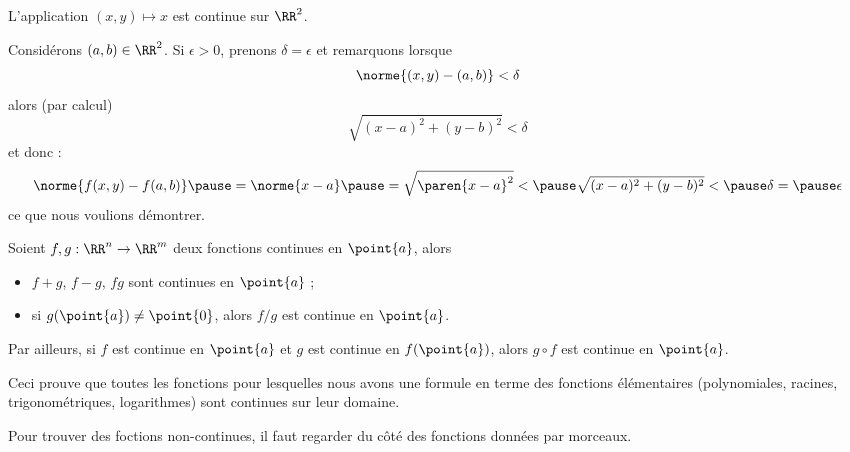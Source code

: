\begin{frame}
  \begin{example}\pause{}
    L'application \((x,y) \mapsto x\) est continue sur \(\RR^{2}\).\pause{}

    Considérons \((a,b)\in\RR^{2}\). \pause{} Si \(\epsilon > 0\), prenons\pause{} \(\delta = \epsilon\) et remarquons\pause{} lorsque
    \begin{equation*}
      \norme{(x,y) - (a,b)} < \delta
    \end{equation*}\pause{}
    alors (par calcul)
    \begin{equation*}
      \sqrt{(x-a)^{2} + (y-b)^{2}} < \delta
    \end{equation*}\pause{}
    et donc :
    \begin{equation*}
      \norme{f(x,y) - f(a,b)}\pause = \norme{x-a}\pause = \sqrt{\paren{x-a}^{2}} < \pause
      \sqrt{(x-a)^{2} + (y-b)^{2}} <\pause \delta =\pause \epsilon
    \end{equation*}
    ce que nous voulions démontrer.
  \end{example}
\end{frame}
\begin{frame}
  \begin{proposition}
    Soient \(f,g : \RR^{n} \to \RR^m\) deux fonctions continues en \(\point{a}\), alors\pause{}
    \begin{itemize}
    \item \(f+g\), \(f-g\), \(fg\) sont continues en \(\point{a}\) ;\pause{}
    \item si \(g(\point{a})\neq \point{0}\),\pause{} alors \(f/g\) est continue en \(\point{a}\).\pause{}
    \end{itemize}\pause{}

    Par ailleurs, si \(f\) est continue en \(\point{a}\) et \(g\) est continue en \(f(\point{a})\),\pause{} alors \(g\circ f\) est continue en \(\point{a}\).
  \end{proposition}
  \begin{remark}\pause{}
    Ceci prouve que toutes les fonctions pour lesquelles nous avons une formule en terme des fonctions élémentaires\pause{} (polynomiales, racines, trigonométriques, logarithmes)\pause{} sont continues sur leur domaine.\pause{}

    Pour trouver des foctions non-continues, il faut regarder du côté des fonctions données \og par morceaux\fg{}.
  \end{remark}
\end{frame}
